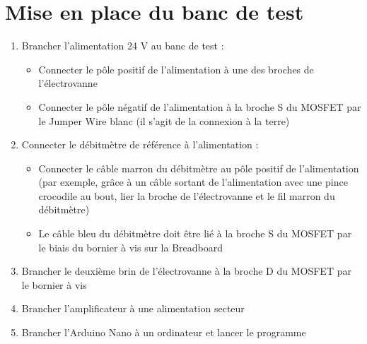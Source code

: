 \section{Mise en place du banc de test}
\begin{enumerate}
    \item Brancher l'alimentation 24 V au banc de test :
          \begin{itemize}
              \item Connecter le pôle positif de l'alimentation à une des broches de l'électrovanne
              \item Connecter le pôle négatif de l'alimentation à la broche S du MOSFET par le Jumper Wire blanc (il s'agit de la connexion à la terre)
          \end{itemize}
          
    \item Connecter le débitmètre de référence à l'alimentation :
          \begin{itemize}
              \item Connecter le câble marron du débitmètre au pôle positif de l'alimentation (par exemple, grâce à un câble sortant de l'alimentation
                    avec une pince crocodile au bout, lier la broche de l'électrovanne et le fil marron du débitmètre)
              \item Le câble bleu du débitmètre doit être lié à la broche S du MOSFET par le biais du bornier à vis sur la Breadboard
          \end{itemize}
          
          
    \item Brancher le deuxième brin de l'électrovanne à la broche D du MOSFET par le bornier à vis\\
          
    \item Brancher l'amplificateur à une alimentation secteur\\
          
    \item Brancher l'Arduino Nano à un ordinateur et lancer le programme\\
          

\end{enumerate}
